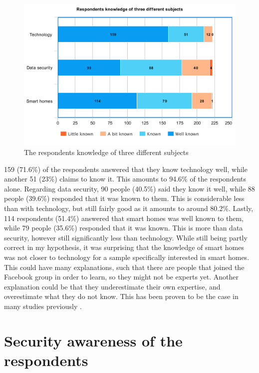\begin{figure}[H]
    \centering
    \includegraphics[scale=0.3]{figures/diagrams/knowledge.pdf}
    \caption{The respondents knowledge of three different subjects}
    \label{fig:knowledge}
\end{figure}

159 (71.6\%) of the respondents answered that they know technology well, while another 51 (23\%) claims to know it. This amounts to 94.6\% of the respondents alone. Regarding data security, 90 people (40.5\%) said they know it well, while 88 people (39.6\%) responded that it was known to them. This is considerable less than with technology, but still fairly good as it amounts to around 80.2\%. Lastly, 114 respondents (51.4\%) answered that smart homes was well known to them, while 79 people (35.6\%) responded that it was known. This is more than data security, however still significantly less than technology. While still being partly correct in my hypothesis, it was surprising that the knowledge of smart homes was not closer to technology for a sample specifically interested in smart homes. This could have many explanations, such that there are people that joined the Facebook group in order to learn, so they might not be experts yet. Another explanation could be that they underestimate their own expertise, and overestimate what they do not know. This has been proven to be the case in many studies previously \cite{Ehrlinger2008} \cite{MCCORMICK1986205}. 

\section{Security awareness of the respondents}

